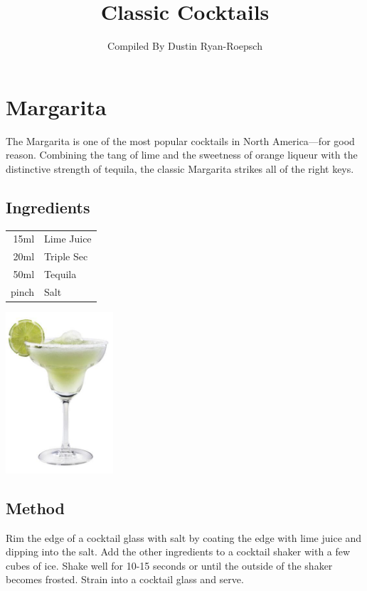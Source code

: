 \documentclass[12pt, letterpaper]{article}
\title{Classic Cocktails}
\author{Compiled By Dustin Ryan-Roepsch}
\begin{document}
\maketitle

\pagebreak
\section{Margarita}
The Margarita is one of the most popular cocktails in North America—for good reason.
Combining the tang of lime and the sweetness of orange liqueur with the distinctive strength of 
tequila, the classic Margarita strikes all of the right keys.

\subsection*{Ingredients}

\begin{multicols}{2}

\begin{tabular} { r | l}
    15ml & Lime Juice \\
    20ml & Triple Sec \\
    50ml & Tequila \\
    pinch & Salt
\end{tabular}

\includegraphics[height=6cm]{margarita}

\end{multicols}


\subsection*{Method}
Rim the edge of a cocktail glass with salt by coating the edge with lime juice and dipping into the salt.
Add the other ingredients to a cocktail shaker with a few cubes of ice.
Shake well for 10-15 seconds or until the outside of the shaker becomes frosted.
Strain into a cocktail glass and serve.
\end{document}
